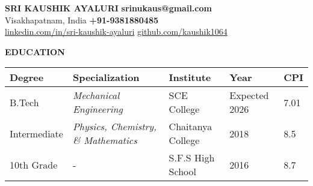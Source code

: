 \documentclass[a4paper,10pt]{article}
\newcommand{\resheading}[1]{%
  \vspace{1em}%
  \noindent\colorbox{mygrey}{%
    \parbox{\dimexpr\linewidth-2\fboxsep\relax}{%
      \textbf{#1}%
    }%
  }%
  \vspace{0.6em}%
}
\begin{document}
\vspace*{-1.5cm}
\noindent
\textbf{SRI KAUSHIK AYALURI} \hfill {\bf srinukaus@gmail.com}\\
Visakhapatnam, India \hfill {\bf +91-9381880485} \\
\href{https://linkedin.com/in/sri-kaushik-ayaluri}{linkedin.com/in/sri-kaushik-ayaluri} \hfill \href{https://github.com/kaushik1064}{github.com/kaushik1064} \\

\resheading{EDUCATION}
\vspace{0.4em}
\begin{tabular}{ p{2.5cm} @{\hskip 0.15in} p{5.5cm} @{\hskip 0.15in} p{3.5cm} @{\hskip 0.15in} p{2.5cm} @{\hskip 0.15in} p{1.5cm} }
\toprule
\textbf{Degree} & \textbf{Specialization} & \textbf{Institute} & \textbf{Year} & \textbf{CPI} \\
\midrule
B.Tech & \textit{Mechanical Engineering} & SCE College & Expected 2026 & 7.01 \\
Intermediate & \textit{Physics, Chemistry, \& Mathematics} & Chaitanya College & 2018 & 8.5 \\
10th Grade & - & S.F.S High School & 2016 & 8.7 \\
\bottomrule
\end{tabular}
\end{document}
